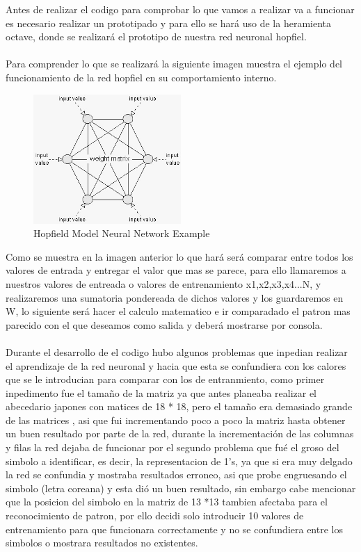 \documentclass[10pt]{article}         %
\begin{document}
Antes de realizar el codigo para comprobar lo que vamos a realizar va a funcionar es necesario realizar un prototipado y para ello se hará uso de la heramienta octave, donde se realizará el prototipo de nuestra red neuronal hopfiel.\\
\\
Para comprender lo que se realizará la siguiente imagen muestra el ejemplo del funcionamiento de la red hopfiel en su comportamiento interno. 

\begin{figure}[htb]
\centering
\includegraphics[width=0.5\textwidth]{hopfiel_startjpeg.jpeg}
\caption{Hopfield Model Neural Network Example}
\label{fig:tigre}
\end{figure}

Como se muestra en la imagen anterior lo que hará será comparar entre todos los valores de entrada y entregar el valor que mas se parece, para ello llamaremos a nuestros valores de entreada o valores de entrenamiento x1,x2,x3,x4...N, y realizaremos una sumatoria pondereada de dichos valores y los guardaremos en W, lo siguiente será hacer el calculo matematico e ir comparadado el patron mas parecido con el que deseamos como salida y deberá mostrarse por consola.
\\
\\
Durante el desarrollo de el codigo hubo algunos problemas que inpedian realizar el aprendizaje de la red neuronal y hacia que esta se confundiera con los calores que se le introducian para comparar con los de entranmiento, como primer inpedimento fue el tamaño de la matriz ya que antes planeaba realizar el abecedario japones con matices de 18 * 18, pero el tamaño era demasiado grande de las matrices , asi que fui incrementando poco a poco la matriz hasta obtener un buen resultado por parte de la red, durante la incrementación de las columnas y filas la red dejaba de funcionar por el segundo problema que fué el groso del simbolo a identificar, es decir, la representacion de 1's, ya que si era muy delgado la red se confundia y mostraba resultados erroneo, asi que probe engruesando el simbolo (letra coreana) y esta dió un buen resultado, sin embargo cabe mencionar que la posicion del simbolo en la matriz de 13 *13 tambien afectaba para el reconocimiento de patron, por ello decidi solo introducir 10 valores de entrenamiento para que funcionara correctamente y no se confundiera entre los simbolos o mostrara resultados no existentes.
\end{document}
